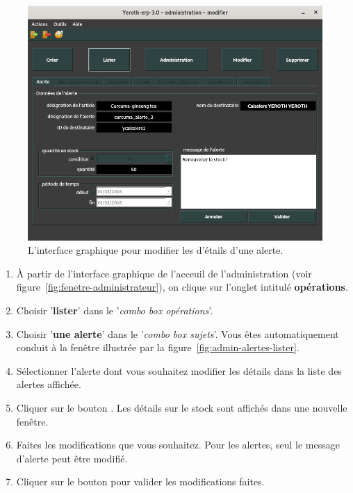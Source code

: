 \begin{figure}[!htpb]
	\centering
	\includegraphics[scale=0.45]{images/alerte-modifier.png}
	\caption{L'interface graphique pour modifier les d'\'etails
	d'une alerte.}\label{fig:admin-alertes-modifier}
\end{figure}

\begin{enumerate}[1)]
	\item \`A partir de l'interface graphique de l'acceuil de
		l'administration (voir figure~\ref{fig:fenetre-administrateur}),
		on clique sur l'onglet intitul\'e \textbf{op\'erations}. 
		
	\item Choisir '\textbf{lister}' dans le '\emph{combo box
		op\'erations}'.
		
	\item Choisir '\textbf{une alerte}' dans le '\emph{combo box
		sujets}'. Vous \^etes automatiquement conduit \`a la fen\^etre
		illustr\'ee par la figure~\ref{fig:admin-alertes-lister}.
		
	\item S\'electionner l'alerte dont vous souhaitez modifier
		les d\'etails dans la liste des alertes affich\'ee.
		
	\item Cliquer sur le bouton . Les d\'etails
		sur le stock sont affich\'es dans une nouvelle fen\^etre.
		
	\item Faites les modifications que vous souhaitez. Pour
		les alertes, seul le message d'alerte peut \^etre
		modifi\'e.
		
	\item Cliquer sur le bouton  pour valider
		les modifications faites.
\end{enumerate}

